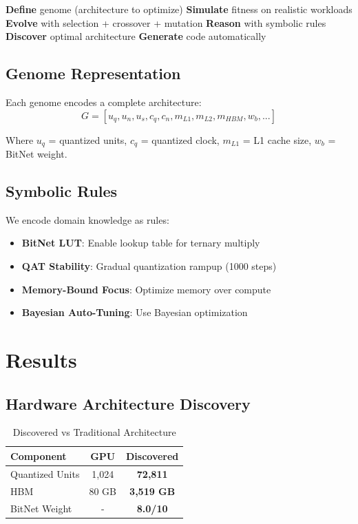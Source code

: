 \documentclass[10pt,conference]{IEEEtran}
\begin{document}
\begin{algorithmic}[1]
\STATE \textbf{Define} genome (architecture to optimize)
\STATE \textbf{Simulate} fitness on realistic workloads
\STATE \textbf{Evolve} with selection + crossover + mutation
\STATE \textbf{Reason} with symbolic rules
\STATE \textbf{Discover} optimal architecture
\STATE \textbf{Generate} code automatically
\end{algorithmic}

\subsection{Genome Representation}

Each genome encodes a complete architecture:
\begin{equation}
G = [u_q, u_n, u_s, c_q, c_n, m_{L1}, m_{L2}, m_{HBM}, w_b, ...]
\end{equation}

Where $u_q$ = quantized units, $c_q$ = quantized clock, $m_{L1}$ = L1 cache size, $w_b$ = BitNet weight.

\subsection{Symbolic Rules}

We encode domain knowledge as rules:
\begin{itemize}
    \item \textbf{BitNet LUT}: Enable lookup table for ternary multiply
    \item \textbf{QAT Stability}: Gradual quantization rampup (1000 steps)
    \item \textbf{Memory-Bound Focus}: Optimize memory over compute
    \item \textbf{Bayesian Auto-Tuning}: Use Bayesian optimization
\end{itemize}

\section{Results}

\subsection{Hardware Architecture Discovery}

\begin{table}[htbp]
\caption{Discovered vs Traditional Architecture}
\begin{center}
\begin{tabular}{lcc}
\toprule
\textbf{Component} & \textbf{GPU} & \textbf{Discovered} \\
\midrule
Quantized Units & 1,024 & \textbf{72,811} \\
HBM & 80 GB & \textbf{3,519 GB} \\
BitNet Weight & - & \textbf{8.0/10} \\
\bottomrule
\end{tabular}
\end{center}
\end{table}
\end{document}
